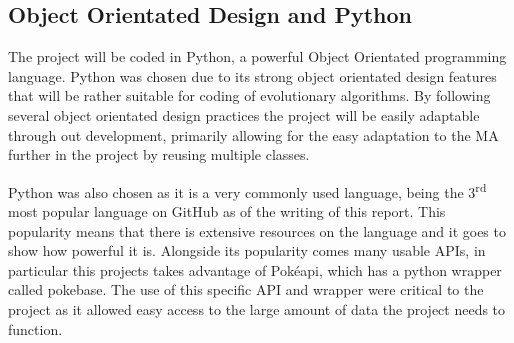 \documentclass[a4paper]{article}
\newcommand{\Pokeapi}{Pok\'{e}api}
\begin{document}
\subsection{Object Orientated Design and Python}
The project will be coded in Python, a powerful Object Orientated programming language.
Python was chosen due to its strong object orientated design features that will be rather suitable for coding of evolutionary algorithms.
By following several object orientated design practices the project will be easily adaptable through out development, primarily allowing for the easy adaptation to the MA further in the project by reusing multiple classes.
\par
Python was also chosen as it is a very commonly used language, being the 3\textsuperscript{rd} most popular language on GitHub\cite{GitHut} as of the writing of this report.
This popularity means that there is extensive resources on the language and it goes to show how powerful it is.
Alongside its popularity comes many usable APIs, in particular this projects takes advantage of \Pokeapi{}, which has a python wrapper called pokebase. The use of this specific API and wrapper were critical to the project as it allowed easy access to the large amount of data the project needs to function.
\end{document}
